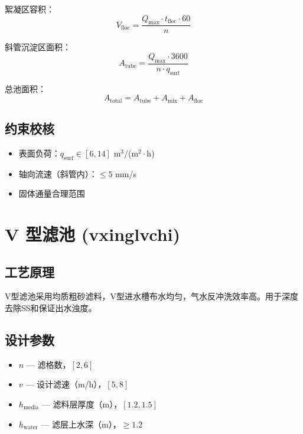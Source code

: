 \documentclass[12pt,a4paper]{ctexart}
\begin{document}
絮凝区容积：
\begin{equation}
V_{\text{floc}} = \frac{Q_{\text{max}} \cdot t_{\text{floc}} \cdot 60}{n}
\end{equation}

斜管沉淀区面积：
\begin{equation}
A_{\text{tube}} = \frac{Q_{\text{max}} \cdot 3600}{n \cdot q_{\text{surf}}}
\end{equation}

总池面积：
\begin{equation}
A_{\text{total}} = A_{\text{tube}} + A_{\text{mix}} + A_{\text{floc}}
\end{equation}

\subsection{约束校核}
\begin{itemize}
  \item 表面负荷：$q_{\text{surf}} \in [6, 14]$ m$^3$/(m$^2\cdot$h)
  \item 轴向流速（斜管内）：$\le 5$ mm/s
  \item 固体通量合理范围
\end{itemize}

\section{V 型滤池 (vxinglvchi)}

\subsection{工艺原理}
V型滤池采用均质粗砂滤料，V型进水槽布水均匀，气水反冲洗效率高。用于深度去除SS和保证出水浊度。

\subsection{设计参数}
\begin{itemize}
  \item $n$ — 滤格数，$[2, 6]$
  \item $v$ — 设计滤速（m/h），$[5, 8]$
  \item $h_{\text{media}}$ — 滤料层厚度（m），$[1.2, 1.5]$
  \item $h_{\text{water}}$ — 滤层上水深（m），$\ge 1.2$
\end{itemize}
\end{document}
